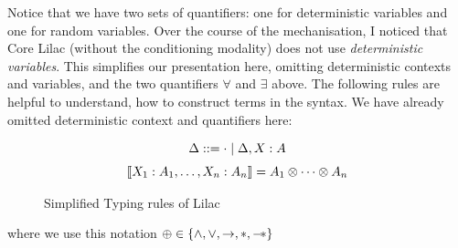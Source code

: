Notice that we have two sets of quantifiers: one for deterministic variables and one for random variables.
Over the course of the mechanisation, I noticed that Core Lilac (without the conditioning modality) does not use \emph{deterministic variables}.
This simplifies our presentation here, omitting deterministic contexts and variables, and the two quantifiers $\forall$ and $\exists$ above. The following
rules are helpful to understand, how to construct terms in the syntax. We have already omitted deterministic context and quantifiers here:

\begin{figure}[hbtp]
\centering
\begin{gather*}
\Delta ::= {} \cdot \mid \Delta, X : A \\[3pt]
\llbracket X_1 : A_1, \ldots, X_n : A_n \rrbracket = A_1 \otimes \cdots \otimes A_n
\end{gather*}
\caption{Simplified Typing rules of Lilac}
\label{fig:typing}
\end{figure}

where we use this notation $\oplus \in \{\land, \lor, \to, *, \mathbin{-\!*}\}$


